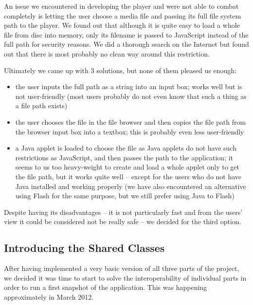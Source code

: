 An issue we encountered in developing the player and were not able to combat completely is letting the user choose a media file and passing its full file system path to the player. We found out that although it is quite easy to load a whole file from disc into memory, only its filename is passed to JavaScript instead of the full path for security reasons. We did a thorough search on the Internet but found out that there is most probably no clean way around this restriction.

Ultimately we came up with 3 solutions, but none of them pleased us enough:

\begin{itemize}
\item the user inputs the full path as a string into an input box; works well but is not user-friendly (most users probably do not even know that such a thing as a file path exists)

\item the user chooses the file in the file browser and then copies the file path from the browser input box into a textbox; this is probably even less user-friendly

\item a Java applet is loaded to choose the file as Java applets do not have such restrictions as JavaScript, and then passes the path to the application; it seems to us too heavy-weight to create and load a whole applet only to get the file path, but it works quite well -- except for the users who do not have Java installed and working properly (we have also encountered an alternative using Flash for the same purpose, but we still prefer using Java to Flash)
\end{itemize}

Despite having its disadvantages -- it is not particularly fast and from the users' view it could be considered not be really safe -- we decided for the third option.

\subsection{Introducing the Shared Classes}
\label{subsec:introducing_shared_classes}

After having implemented a very basic version of all three parts of the project, we decided it was time to start to solve the interoperability of individual parts in order to run a first snapshot of the application. This was happening approximately in March 2012.

